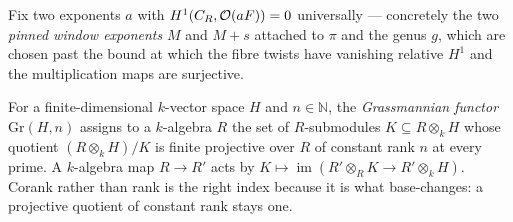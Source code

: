 Fix two exponents \(a\) with \(H^1(C_R, \mathcal{O}(aF)) = 0\) universally --- concretely the two
\emph{pinned window exponents} \(M\) and \(M+s\) attached to \(\pi\) and the genus \(g\),
which are chosen past the bound at which the fibre twists have vanishing relative \(H^1\)
and the multiplication maps are surjective.

\begin{definition}
  \label{pa-def:grFunctorAff}
  \leanok

  For a finite-dimensional \(k\)-vector space \(H\) and \(n \in \mathbb{N}\), the
  \emph{Grassmannian functor} \(\mathrm{Gr}(H, n)\) assigns to a \(k\)-algebra \(R\) the set
  of \(R\)-submodules \(K \subseteq R \otimes_k H\) whose quotient \((R \otimes_k H)/K\) is
  finite projective over \(R\) of constant rank \(n\) at every prime. A \(k\)-algebra map
  \(R \to R'\) acts by \(K \mapsto \operatorname{im}(R' \otimes_R K \to R' \otimes_k H)\).
  Corank rather than rank is the right index because it is what base-changes: a projective
  quotient of constant rank stays one.
\end{definition}

